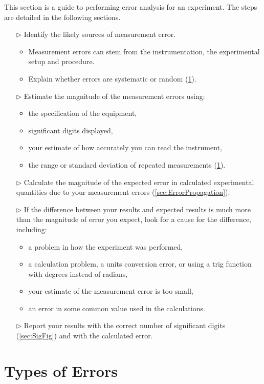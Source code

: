 This section is a guide to performing error analysis for an experiment.  The steps are detailed in the following sections.
\begin{itemize}
\item[\(\triangleright\)] Identify the likely sources of measurement error.
  \begin{itemize}
  \item Measurement errors can stem from the instrumentation, the experimental setup and procedure.
  \item Explain whether errors are systematic or random (\ref{sec:TypesErrors}).
  \end{itemize}
\item[\(\triangleright\)] Estimate the magnitude of the measurement errors using:
  \begin{itemize}
  \item the specification of the equipment,
  \item significant digits displayed,
  \item your estimate of how accurately you can read the instrument,
  \item the range or standard deviation of repeated measurements (\ref{sec:TypesErrors}).
  \end{itemize}
\item[\(\triangleright\)] Calculate the magnitude of the expected error in calculated experimental quantities due to your measurement errors (\ref{sec:ErrorPropagation}).
\item[\(\triangleright\)] If the difference between your results and expected results is much more than the magnitude of error you expect, look for a cause for the difference, including:
  \begin{itemize}
  \item a problem in how the experiment was performed,
  \item a calculation problem, a units conversion error, or using a trig function with degrees instead of radians,
  \item your estimate of the measurement error is too small,
  \item an error in some common value used in the calculations.
  \end{itemize}
\item[\(\triangleright\)] Report your results with the correct number of significant digits (\ref{sec:SigFig}) and with the calculated error.
\end{itemize}

\section{Types of Errors}
\label{sec:TypesErrors}

